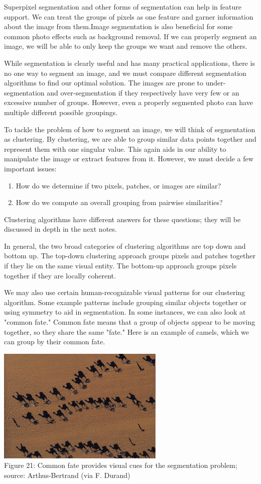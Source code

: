 \documentclass{article}
\begin{document}
Superpixel segmentation and other forms of segmentation can help in feature support. We can treat the groups of pixels as one feature and garner information about the image from them.Image segmentation is also beneficial for some common photo effects such as background removal. If we can properly segment an image, we will be able to only keep the groups we want and remove the others.

While segmentation is clearly useful and has many practical applications, there is no one way to segment an image, and we must compare different segmentation algorithms to find our optimal solution. The images are prone to under-segmentation and over-segmentation if they respectively have very few or an excessive number of groups. However, even a properly segmented photo can have multiple different possible groupings.

To tackle the problem of how to segment an image, we will think of segmentation as clustering. By clustering, we are able to group similar data points together and represent them with one singular value. This again aids in our ability to manipulate the image or extract features from it. However, we must decide a few important issues:
\begin{enumerate}
\item How do we determine if two pixels, patches, or images are similar?
\item How do we compute an overall grouping from	
pairwise similarities?
\end{enumerate}
Clustering algorithms have different answers for these questions; they will be discussed in depth in the next notes.

In general, the two broad categories of clustering algorithms are top down and bottom up. The top-down clustering approach groups pixels and patches together if they lie on the same visual entity. The bottom-up approach groups pixels together if they are locally coherent.

We may also use certain human-recognizable visual patterns for our clustering algorithm. Some example patterns include grouping similar objects together or using symmetry to aid in segmentation. In some instances, we can also look at "common fate." Common fate means that a group of objects appear to be moving together, so they share the same "fate." Here is an example of camels, which we can group by their common fate.

\begin{center}
\includegraphics[width=8cm]{camels.png} \\
Figure 21: Common fate provides visual cues for the segmentation problem; source: Arthus-Bertrand (via F. Durand)
\end{center}
\end{document}

